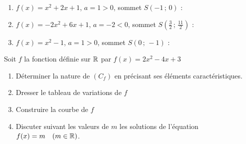 \documentclass[10pt, a4paper]{article}
\begin{document}
\begin{Solution}[APPLICATION][21]
\begin{enumerate}[leftmargin=*,itemsep=0.5pt]
    \item $f(x) = x^2 + 2x + 1$, $a = 1 > 0$, sommet $S(-1\,;\,0)$ :
    \begin{center}
    \end{center}

    \item $f(x) = -2x^2 + 6x + 1$, $a = -2 < 0$, sommet $S\!\left(\frac{3}{2}\,;\,\frac{11}{2}\right)$ :
    \begin{center}
    \end{center}

    \item $f(x) = x^2 - 1$, $a = 1 > 0$, sommet $S(0\,;\,-1)$ :
    \begin{center}
    \end{center}
\end{enumerate}
\end{Solution}


\begin{Application}[][30 min]
Soit $f$ la fonction définie sur $\mathbb{R}$ par $f(x) = 2x^2 - 4x + 3$
\begin{enumerate}[leftmargin=*,itemsep=0.5pt]
    \item Déterminer la nature de $(C_f)$ en précisant ses éléments caractéristiques.
    \item Dresser le tableau de variations de $f$
    \item Construire la courbe de $f$
    \item Discuter suivant les valeurs de $m$ les solutions de l'équation $f(x) = m \quad (m \in \mathbb{R})$.
\end{enumerate}
\end{Application}
\end{document}
